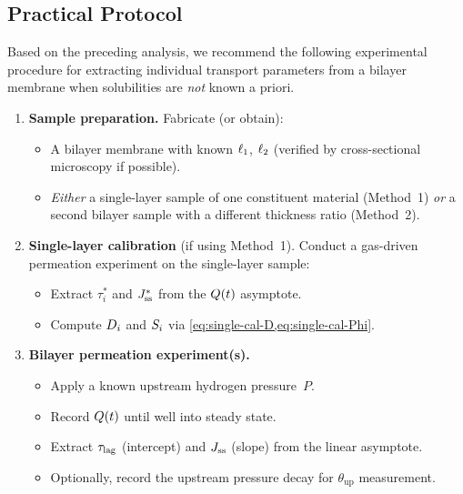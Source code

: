 \subsection{Practical Protocol}
\label{sec:protocol}

Based on the preceding analysis, we recommend the following experimental
procedure for extracting individual transport parameters from a bilayer
membrane when solubilities are \emph{not} known a priori.

\begin{enumerate}
  \item \textbf{Sample preparation.}  Fabricate (or obtain):
        \begin{itemize}
          \item A bilayer membrane with known $\ell_{1}$, $\ell_{2}$ (verified by
                cross-sectional microscopy if possible).
          \item \emph{Either} a single-layer sample of one constituent material
                (Method~1) \emph{or} a second bilayer sample with a different
                thickness ratio (Method~2).
        \end{itemize}

  \item \textbf{Single-layer calibration} (if using Method~1).
        Conduct a gas-driven permeation experiment on the single-layer sample:
        \begin{itemize}
          \item Extract $\tau_i^*$ and $J_{\mathrm{ss}}^*$ from the $Q(t)$ asymptote.
          \item Compute $D_{i}$ and $S_{i}$ via \cref{eq:single-cal-D,eq:single-cal-Phi}.
        \end{itemize}

  \item \textbf{Bilayer permeation experiment(s).}
        \begin{itemize}
          \item Apply a known upstream hydrogen pressure~$P$.
          \item Record $Q(t)$ until well into steady state.
          \item Extract $\tau_{\mathrm{lag}}$ (intercept) and $J_{\mathrm{ss}}$ (slope) from the linear
                asymptote.
          \item Optionally, record the upstream pressure decay for
                $\theta_{\mathrm{up}}$ measurement.
        \end{itemize}


\end{enumerate}
